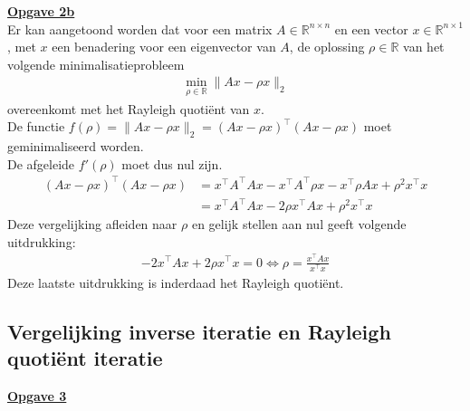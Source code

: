 \documentclass[a4paper, 12pt, titlepage, fleqn]{article}
\begin{document}
\underline{\textbf{Opgave 2b}}\\

Er kan aangetoond worden dat voor een matrix $A \in \mathbb{R}^{n\times n}$ en een vector $x \in \mathbb{R}^{n \times 1}$, met $x$ een benadering voor een eigenvector van $A$, de oplossing $\rho \in \mathbb{R}$ van het volgende minimalisatieprobleem
\begin{align*}
\min_{\rho \in \mathbb{R}} \| Ax - \rho x\|_2
\end{align*}
overeenkomt met het Rayleigh quoti\"ent van $x$. \\

De functie $f(\rho) = \|Ax-\rho x\|_2 = (Ax-\rho x)^\intercal(Ax-\rho x)$ moet geminimaliseerd worden.\\ De afgeleide $f'(\rho)$ moet dus nul zijn.
\begin{align*}
(Ax-\rho x)^\intercal (Ax-\rho x) &= x^\intercal A^\intercal Ax - x^\intercal A^\intercal\rho x - x^\intercal\rho Ax + \rho^2x^\intercal x\\
&= x^\intercal A^\intercal Ax -2\rho x^\intercal Ax + \rho^2x^\intercal x
\end{align*}
Deze vergelijking afleiden naar $\rho$ en gelijk stellen aan nul geeft volgende uitdrukking:
\begin{align*}
-2x^\intercal Ax + 2\rho x^\intercal x = 0 \Leftrightarrow \rho = \frac{x^\intercal Ax}{x^\intercal x}
\end{align*}
Deze laatste uitdrukking is inderdaad het Rayleigh quoti\"ent.

\subsection{Vergelijking inverse iteratie en Rayleigh quoti\"ent iteratie}
\underline{\textbf{Opgave 3}}\\
\end{document}

